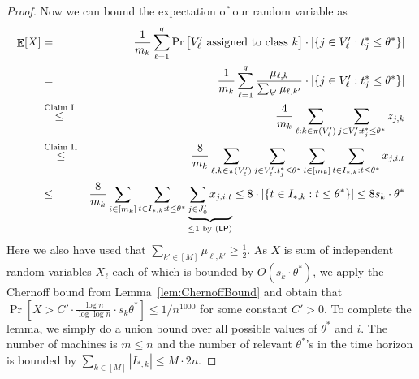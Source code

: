 \begin{proof}
  Now we can bound the expectation of our random variable as
  \begin{eqnarray*}
    \mathop{\mathbb{E}}[X] &=& \frac{1}{m_k} \sum_{\ell=1}^q \Pr\big[V_{\ell}'\textrm{ assigned to class }k\big] \cdot |\{j \in V_{\ell}': t_j^* \leq \theta^*\}| \\
          &=& \frac{1}{m_k} \sum_{\ell=1}^q \frac{\mu_{\ell,k}}{\sum_{k'} \mu_{\ell,k'}} \cdot |\{j \in V_{\ell}': t_j^* \leq \theta^*\}| \\
    &\stackrel{\textrm{Claim I}}{\leq}& \frac{4}{m_k} \sum_{\ell: k \in \pi(V_{\ell}')} \sum_{j \in V_{\ell}': t_j^* \leq \theta^*} z_{j,k} \\
          &\stackrel{\textrm{Claim II}}{\leq}& \frac{8}{m_k} \sum_{\ell: k \in \pi(V_{\ell}')} \sum_{j \in V_{\ell}': t_j^* \leq \theta^*} \sum_{i \in [m_k]} \sum_{t \in I_{*,k}: t \leq \theta^*} x_{j,i,t} \\
   &\leq& \frac{8}{m_k} \sum_{i \in [m_k]} \sum_{t \in I_{*,k}: t \leq \theta^*} \underbrace{\sum_{j \in J_0'}  x_{j,i,t}}_{\leq 1\textrm{ by }(\mathsf{LP})} \leq 8 \cdot |\{ t \in I_{*,k}: t \leq \theta^*\}| \leq 8s_k \cdot \theta^*
  \end{eqnarray*}
  Here we also have used that $\sum_{k' \in [M]} \mu_{\ell,k'} \geq \frac{1}{2}$. 
  As $X$ is sum of independent random variables $X_\ell$ each of which is bounded by $O(s_k \cdot \theta^*)$, we apply the Chernoff bound from Lemma~\ref{lem:ChernoffBound} and obtain that $\Pr[X > C' \cdot \frac{\log n}{\log \log n} \cdot s_k \theta^*] \leq 1/n^{1000}$ for some constant $C'>0$.
  To complete the lemma, we simply do a union bound over all possible values of $\theta^*$ and $i$. The number of machines is $m \leq n$ and the number of relevant $\theta^*$'s in the time horizon is bounded by $\sum_{k \in [M]} |I_{*,k}| \leq M \cdot 2n$.
  \end{proof}
  
